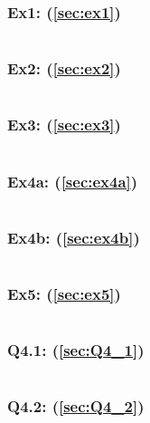\documentclass[12pt]{article}
\begin{document}
\subsubsection{Ex1: (\ref{sec:ex1})}\label{appendix:ex1}
\inputminted{matlab}{matlab/ex1.m}

\subsubsection{Ex2: (\ref{sec:ex2})}\label{appendix:ex2}
\inputminted{matlab}{matlab/ex2.m}

\subsubsection{Ex3: (\ref{sec:ex3})}\label{appendix:ex3}
\inputminted{matlab}{matlab/ex3.m}

\subsubsection{Ex4a: (\ref{sec:ex4a})}\label{appendix:ex4a}
\inputminted{matlab}{matlab/ex4a.m}

\subsubsection{Ex4b: (\ref{sec:ex4b})}\label{appendix:ex4b}
\inputminted{matlab}{matlab/ex4b.m}

\subsubsection{Ex5: (\ref{sec:ex5})}\label{appendix:ex5}
\inputminted{matlab}{matlab/ex5.m}

\subsubsection{Q4.1: (\ref{sec:Q4_1})}\label{appendix:Q4_1}
\inputminted{matlab}{matlab/Q4_1.m}

\subsubsection{Q4.2: (\ref{sec:Q4_2})}\label{appendix:Q4_2}
\inputminted{matlab}{matlab/Q4_2.m}
\end{document}
